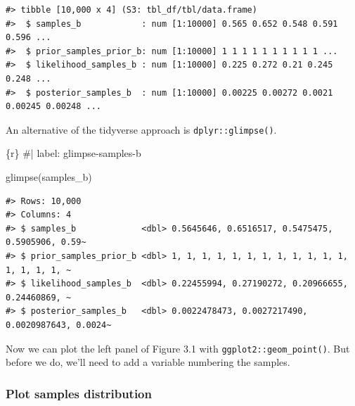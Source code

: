 \documentclass[
  letterpaper,
  DIV=11,
  numbers=noendperiod]{scrreprt}
\newenvironment{Shaded}{\begin{snugshade}}{\end{snugshade}}
\newcommand{\CommentTok}[1]{\textcolor[rgb]{0.37,0.37,0.37}{#1}}
\newcommand{\FunctionTok}[1]{\textcolor[rgb]{0.28,0.35,0.67}{#1}}
\newcommand{\InformationTok}[1]{\textcolor[rgb]{0.37,0.37,0.37}{#1}}
\newcommand{\NormalTok}[1]{\textcolor[rgb]{0.00,0.23,0.31}{#1}}
\begin{document}
\begin{verbatim}
#> tibble [10,000 x 4] (S3: tbl_df/tbl/data.frame)
#>  $ samples_b            : num [1:10000] 0.565 0.652 0.548 0.591 0.596 ...
#>  $ prior_samples_prior_b: num [1:10000] 1 1 1 1 1 1 1 1 1 1 ...
#>  $ likelihood_samples_b : num [1:10000] 0.225 0.272 0.21 0.245 0.248 ...
#>  $ posterior_samples_b  : num [1:10000] 0.00225 0.00272 0.0021 0.00245 0.00248 ...
\end{verbatim}

An alternative of the tidyverse approach is \texttt{dplyr::glimpse()}.

\begin{Shaded}
\begin{Highlighting}[]
\InformationTok{\textasciigrave{}\textasciigrave{}\textasciigrave{}\{r\}}
\CommentTok{\#| label: glimpse{-}samples{-}b}

\FunctionTok{glimpse}\NormalTok{(samples\_b)}
\InformationTok{\textasciigrave{}\textasciigrave{}\textasciigrave{}}
\end{Highlighting}
\end{Shaded}

\begin{verbatim}
#> Rows: 10,000
#> Columns: 4
#> $ samples_b             <dbl> 0.5645646, 0.6516517, 0.5475475, 0.5905906, 0.59~
#> $ prior_samples_prior_b <dbl> 1, 1, 1, 1, 1, 1, 1, 1, 1, 1, 1, 1, 1, 1, 1, 1, ~
#> $ likelihood_samples_b  <dbl> 0.22455994, 0.27190272, 0.20966655, 0.24460869, ~
#> $ posterior_samples_b   <dbl> 0.0022478473, 0.0027217490, 0.0020987643, 0.0024~
\end{verbatim}

Now we can plot the left panel of Figure 3.1 with
\texttt{ggplot2::geom\_point()}. But before we do, we'll need to add a
variable numbering the samples.

\hypertarget{plot-samples-distribution-1}{%
\subsubsection{Plot samples
distribution}\label{plot-samples-distribution-1}}
\end{document}
